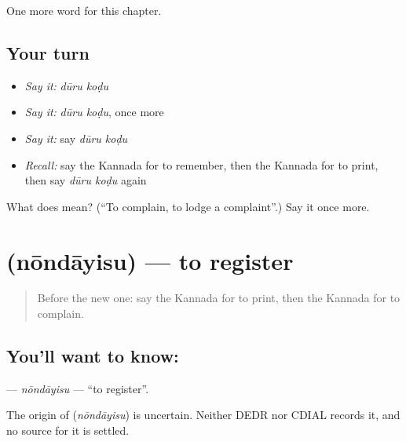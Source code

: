 \begin{grammarlens}[title={What you've built}]
One more word for this chapter.
\end{grammarlens}

\subsection*{Your turn}
\begin{itemize}
\raggedright
  \item \emph{Say it:} \emph{dūru koḍu}
  \item \emph{Say it:} \emph{dūru koḍu}, once more
  \item \emph{Say it:} say \emph{dūru koḍu}
  \item \emph{Recall:} say the Kannada for to remember, then the Kannada for to print, then say \emph{dūru koḍu} again
\end{itemize}

\begin{tcolorbox}[breakable,colback=teal!4,colframe=teal!35!black,title={Before you move on}]
What does   mean? (\textquotedblleft{}To complain, to lodge a complaint\textquotedblright{}.) Say it once more.
\end{tcolorbox}
\section[\texorpdfstring{\kn{ನೋಂದಾಯಿಸು} (nōndāyisu)}{ನೋಂದಾಯಿಸು (nōndāyisu)}]{ (nōndāyisu) — to register}

\label{lesson:KA-C202-nondayisu}



\begin{quote}
Before the new one: say the Kannada for to print, then the Kannada for to complain.
\end{quote}

\subsection*{You'll want to know: }
\textbf{} — \emph{nōndāyisu} — \textquotedblleft{}to register\textquotedblright{}.

\begin{cousinweb}
The origin of \textbf{} (\emph{nōndāyisu}) is uncertain. Neither DEDR nor CDIAL records it, and no source for it is settled.
\end{cousinweb}

